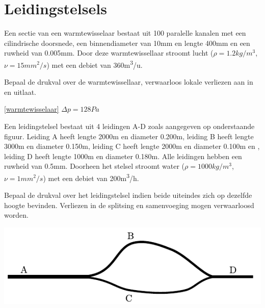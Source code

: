 \chapter{Leidingstelsels}
\label{sec:Leidingstelsels}
\begin{toepassing}[*]
	\label{warmtewisselaar}
Een sectie van een warmtewisselaar bestaat uit 100 paralelle kanalen met een cilindrische doorsnede, een binnendiameter van 10mm en lengte 400mm en een ruwheid van 0.005mm. Door deze warmtewissellaar stroomt lucht ($\rho=1.2\unit{kg/m^3}$, $\nu=15\unit{mm^2/s}$) met een debiet van 360\unit{m^3/u}.
		
Bepaal de drukval over de warmtewissellaar, verwaarloos lokale verliezen aan in en uitlaat.	
\end{toepassing}
\begin{antwoord}{\ref{warmtewisselaar}}
	$\Delta p = 128\unit{Pa}$
\end{antwoord}
\begin{toepassing}[*]
	\label{serie parallel}
Een leidingstelsel bestaat uit 4 leidingen A-D zoals aangegeven op onderstaande figuur. Leiding A heeft lengte 2000m en diameter 0.200m, leiding B heeft lengte 3000m en diameter 0.150m, leiding C heeft lengte 2000m en diameter 0.100m en , leiding D heeft lengte 1000m en diameter 0.180m. Alle leidingen hebben een ruwheid van 0.5mm. Doorheen het stelsel stroomt water ($\rho=1000\unit{kg/m^3}$, $\nu=1\unit{mm^2/s}$) met een debiet van 200\unit{m^3/h}.

Bepaal de drukval over het leidingstelsel indien beide uiteindes zich op dezelfde hoogte bevinden. Verliezen in de splitsing en samenvoeging mogen verwaarloosd worden.

	\centering
	\includegraphics{fig/leidingstelsels/serie_parallel}
\end{toepassing}
